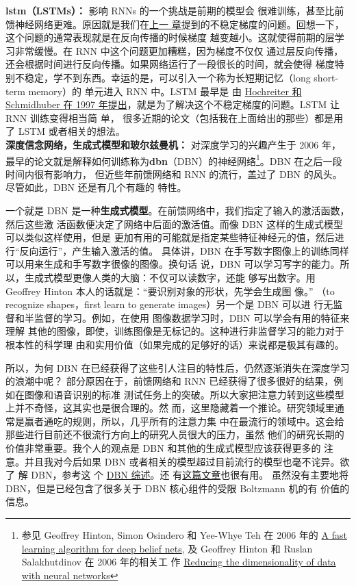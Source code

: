 \textbf{\gls{lstm}（LSTMs）：} 影响 RNNs 的一个挑战是前期的模型会
很难训练，甚至比前馈神经网络更难。原因就是我们在\hyperref[ch:WhyHardToTrain]{上一
  章}提到的不稳定梯度的问题。回想一下，这个问题的通常表现就是在反向传播的时候梯度
越变越小。这就使得前期的层学习非常缓慢。在 RNN 中这个问题更加糟糕，因为梯度不仅仅
通过层反向传播，还会根据时间进行反向传播。如果网络运行了一段很长的时间，就会使得
梯度特别不稳定，学不到东西。幸运的是，可以引入一个称为长短期记忆（long short-term memory）的
单元进入 RNN 中。LSTM 最早是
由 \href{http://dx.doi.org/10.1162/neco.1997.9.8.1735}{Hochreiter 和 Schmidhuber
  在 1997 年提出}，就是为了解决这个不稳定梯度的问题。LSTM 让 RNN 训练变得相当简
单，
很多近期的论文（包括我在上面给出的那些）都是用了 LSTM 或者相关的想法。\\

\textbf{深度信念网络，生成式模型和玻尔兹曼机：} 对深度学习的兴趣产生于 2006 年，
最早的论文就是解释如何训练称为\textbf{\gls{dbn}}（DBN）的神经网络\footnote{参见 Geoffrey
  Hinton, Simon Osindero 和 Yee-Whye
  Teh 在 2006 年的 \href{http://www.cs.toronto.edu/~hinton/absps/fastnc.pdf}{A
    fast learning algorithm for deep belief nets}, 及 Geoffrey Hinton 和 Ruslan
  Salakhutdinov 在 2006 年的相关工
  作 \href{http://www.sciencemag.org/content/313/5786/504.short}{Reducing the
    dimensionality of data with neural networks}}。DBN 在之后一段时间内很有影响力，
但近些年前馈网络和 RNN 的流行，盖过了 DBN 的风头。尽管如此，DBN 还是有几个有趣的
特性。

一个就是 DBN 是一种\textbf{生成式模型}。在前馈网络中，我们指定了输入的激活函数，然后这些激
活函数便决定了网络中后面的激活值。而像 DBN 这样的生成式模型可以类似这样使用，但是
更加有用的可能就是指定某些特征神经元的值，然后进行“反向运行”，产生输入激活的值。
具体讲，DBN 在手写数字图像上的训练同样可以用来生成和手写数字很像的图像。换句话
说，DBN 可以学习写字的能力。所以，生成式模型更像人类的大脑：不仅可以读数字，还能
够写出数字。用 Geoffrey Hinton 本人的话就是：“要识别对象的形状，先学会生成图
像。” （to recognize shapes，first learn to generate images）另一个是 DBN 可以进
行无监督和半监督的学习。例如，在使用 图像数据学习时，DBN 可以学会有用的特征来理解
其他的图像，即使，训练图像是无标记的。这种进行非监督学习的能力对于根本性的科学理
由和实用价值（如果完成的足够好的话）来说都是极其有趣的。

所以，为何 DBN 在已经获得了这些引人注目的特性后，仍然逐渐消失在深度学习的浪潮中呢？
部分原因在于，前馈网络和 RNN 已经获得了很多很好的结果，例如在图像和语音识别的标准
测试任务上的突破。所以大家把注意力转到这些模型上并不奇怪，这其实也是很合理的。然
而，这里隐藏着一个推论。研究领域里通常是赢者通吃的规则，所以，几乎所有的注意力集
中在最流行的领域中。这会给那些进行目前还不很流行方向上的研究人员很大的压力，虽然
他们的研究长期的价值非常重要。我个人的观点是 DBN 和其他的生成式模型应该获得更多的
注意。并且我对今后如果 DBN 或者相关的模型超过目前流行的模型也毫不诧异。欲了
解 DBN，参考这
个 \href{http://www.scholarpedia.org/article/Deep_belief_networks}{DBN 综述}。还
有\href{http://www.cs.toronto.edu/~hinton/absps/guideTR.pdf}{这篇文章}也很有用。
虽然没有主要地将 DBN，但是已经包含了很多关于 DBN 核心组件的受限 Boltzmann 机的有
价值的信息。\\

